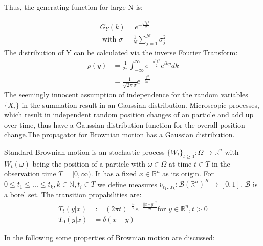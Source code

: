 \documentclass[
  a4paper,BCOR10mm,oneside,
  bibtotoc,idxtotoc,
  headsepline,footsepline,%
  fleqn,openbib
]{scrbook}
\begin{document}
Thus, the generating function for large N is:

\begin{align}
 G_Y(k)=e^{- \frac{\sigma^2 k^2}{2}} \\ \nonumber
 \text{ with } \sigma =  \frac{1}{N} \sum_{j=1}^N \sigma_j^2 
\end{align}
The distribution of Y can be calculated via the inverse Fourier Transform:
\begin{align}
 \rho(y) &=\frac{1}{2 \pi} \int_{-\infty}^{\infty} e^{- \frac{\sigma^2 k^2}{2}} e^{i k y} dk \\  
 &=\frac{1}{\sqrt{2 \pi} \sigma } e^{-\frac{y^2}{2 \sigma^2}}
\end{align}
The seemingly innocent assumption of independence for the random variables $\{X_i\}$ in the summation result in an Gaussian distribution. Microscopic processes, which result in independent random position changes of an particle and add up over time, thus have a Gaussian distribution function for the overall position change.The propagator for Brownian motion has a Gaussian distribution.
\begin{mydef}
Standard Brownian motion is an stochastic process $ \{ W_t \}_{t\geq0}: \Omega \rightarrow \mathbb{R}^n$ with $ W_t(\omega)$ being the position of a particle with $\omega \in \Omega$ at time $t \in T$ in the observation time $T =[0, \infty)$. It has a fixed $x \in \mathbb{R}^n$ as its origin. For $ 0 \leq t_1 \leq ... \leq t_k, k \in \mathbb{N}, t_i \in T $ we define measures $\nu_{t_{1}... t_{k}}: \mathcal{B}(\mathbb{R}^n)^K \rightarrow [0,1]$. $\mathcal{B}$ is a borel set. The transition propabilities are: 
\begin{align}
T_{t}(y|x) & := (2 \pi t)^{- \frac{n}{2}} e^{- \frac{||x-y||^2}{2 t}} \text{for } y \in \mathbb{R}^n, t>0 \\ \nonumber
T_{0}(y|x) & = \delta(x-y) 
\end{align}
\end{mydef}
In the following some properties of Brownian motion are discussed:\\
\end{document}
